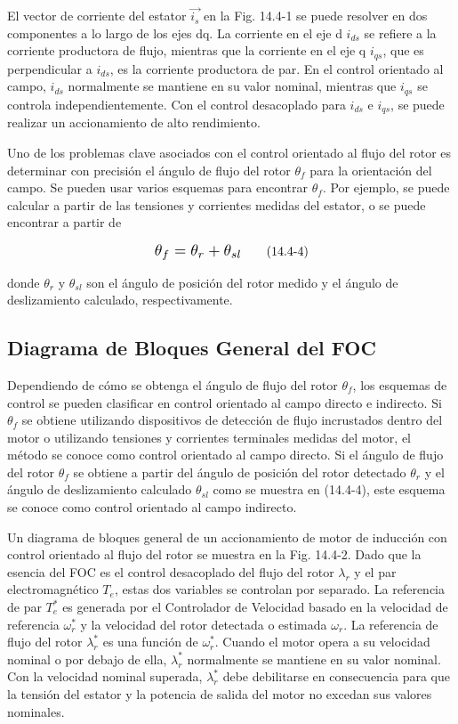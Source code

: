 \documentclass[letterpaper,12pt]{article} %
\begin{document}
El vector de corriente del estator \( \vec{i_s} \) en la Fig. 14.4-1 se puede resolver en dos componentes a lo largo de los ejes dq. La corriente en el eje d \( i_{ds} \) se refiere a la corriente productora de flujo, mientras que la corriente en el eje q \( i_{qs} \), que es perpendicular a \( i_{ds} \), es la corriente productora de par. En el control orientado al campo, \( i_{ds} \) normalmente se mantiene en su valor nominal, mientras que \( i_{qs} \) se controla independientemente. Con el control desacoplado para \( i_{ds} \) e \( i_{qs} \), se puede realizar un accionamiento de alto rendimiento.

Uno de los problemas clave asociados con el control orientado al flujo del rotor es determinar con precisión el ángulo de flujo del rotor \( \theta_f \) para la orientación del campo. Se pueden usar varios esquemas para encontrar \( \theta_f \). Por ejemplo, se puede calcular a partir de las tensiones y corrientes medidas del estator, o se puede encontrar a partir de

\[
\scalebox{1.25}{$\theta_f = \theta_r + \theta_{sl}$} \tag{14.4-4}
\]

donde \( \theta_r \) y \( \theta_{sl} \) son el ángulo de posición del rotor medido y el ángulo de deslizamiento calculado, respectivamente.

\subsection{Diagrama de Bloques General del FOC}

Dependiendo de cómo se obtenga el ángulo de flujo del rotor \( \theta_f \), los esquemas de control se pueden clasificar en control orientado al campo directo e indirecto. Si \( \theta_f \) se obtiene utilizando dispositivos de detección de flujo incrustados dentro del motor o utilizando tensiones y corrientes terminales medidas del motor, el método se conoce como control orientado al campo directo. Si el ángulo de flujo del rotor \( \theta_f \) se obtiene a partir del ángulo de posición del rotor detectado \( \theta_r \) y el ángulo de deslizamiento calculado \( \theta_{sl} \) como se muestra en (14.4-4), este esquema se conoce como control orientado al campo indirecto.

Un diagrama de bloques general de un accionamiento de motor de inducción con control orientado al flujo del rotor se muestra en la Fig. 14.4-2. Dado que la esencia del FOC es el control desacoplado del flujo del rotor \( \lambda_r \) y el par electromagnético \( T_e \), estas dos variables se controlan por separado. La referencia de par \( T_e^* \) es generada por el Controlador de Velocidad basado en la velocidad de referencia \( \omega_r^* \) y la velocidad del rotor detectada o estimada \( \omega_r \). La referencia de flujo del rotor \( \lambda_r^* \) es una función de \( \omega_r^* \). Cuando el motor opera a su velocidad nominal o por debajo de ella, \( \lambda_r^* \) normalmente se mantiene en su valor nominal. Con la velocidad nominal superada, \( \lambda_r^* \) debe debilitarse en consecuencia para que la tensión del estator y la potencia de salida del motor no excedan sus valores nominales.
\end{document}
